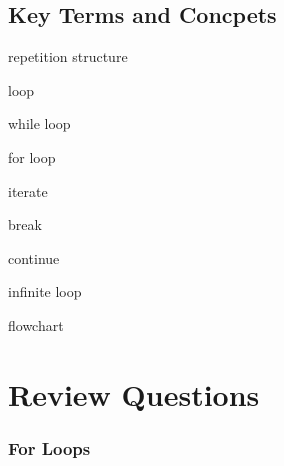 \documentclass{book}
\newenvironment{key_terms}{\begin{multicols}{3}}{\end{multicols}} %
\begin{document}
    
        \hypertarget{key-terms-and-concpets}{%
\subsection{Key Terms and Concpets}\label{key-terms-and-concpets}}
    




    
        \begin{key_terms}
        repetition structure

loop

while loop

for loop

iterate

break

continue

infinite loop

flowchart
        \end{key_terms}

    




    
        \hypertarget{review-questions}{%
\section{Review Questions}\label{review-questions}}
    




    
        \hypertarget{for-loops}{%
\subsubsection{For Loops}\label{for-loops}}
    
\end{document}
